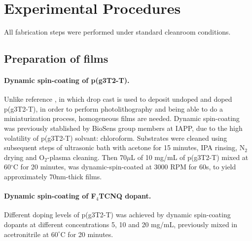 \section{Experimental Procedures}

All fabrication steps were performed under standard cleanroom conditions.

\subsection{Preparation of films}

\paragraph{Dynamic spin-coating of p(g3T2-T).}Unlike reference \cite{tanTuningOrganicElectrochemical2022}, in which drop cast is used to deposit undoped and doped p(g3T2-T), in order to perform photolithography and being able to do a miniaturization process, homogeneous films are needed. Dynamic spin-coating was previously stablished by BioSens group members at IAPP, due to the high volatility of p(g3T2-T) solvant: chloroform. Substrates were cleaned using subsequent steps of ultrasonic bath with acetone for 15 minutes, IPA rinsing, N$_{2}$ drying and O$_{2}$-plasma cleaning. Then 70$\mu$L of 10 mg/mL of p(g3T2-T) mixed at 60$^{\circ}$C for 20 minutes, was dynamic-spin-coated at 3000 RPM for 60s, to yield approximately 70nm-thick films.

\paragraph{Dynamic spin-coating of F$_{4}$TCNQ dopant.}Different doping levels of p(g3T2-T) was achieved by dynamic spin-coating dopants at different concentrations 5, 10 and 20 mg/mL, previously mixed in acetronitrile at $60^{\circ}$C for 20 minutes.


